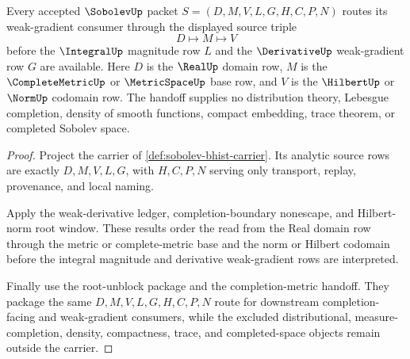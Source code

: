 \begin{theorem}
\label{thm:sobolev-source-triple-handoff}
Every accepted $\SobolevUp$ packet $S=(D,M,V,L,G,H,C,P,N)$ routes its weak-gradient consumer through the displayed source triple
$$
D \longmapsto M \longmapsto V
$$
before the $\IntegralUp$ magnitude row $L$ and the $\DerivativeUp$ weak-gradient row $G$ are available. Here $D$ is the $\RealUp$ domain row, $M$ is the $\CompleteMetricUp$ or $\MetricSpaceUp$ base row, and $V$ is the $\HilbertUp$ or $\NormUp$ codomain row. The handoff supplies no distribution theory, Lebesgue completion, density of smooth functions, compact embedding, trace theorem, or completed Sobolev space.
\end{theorem}
\begin{proof}
Project the carrier of \autoref{def:sobolev-bhist-carrier}. Its analytic source rows are exactly $D,M,V,L,G$, with $H,C,P,N$ serving only transport, replay, provenance, and local naming.

Apply the weak-derivative ledger, completion-boundary nonescape, and Hilbert-norm root window. These results order the read from the Real domain row through the metric or complete-metric base and the norm or Hilbert codomain before the integral magnitude and derivative weak-gradient rows are interpreted.

Finally use the root-unblock package and the completion-metric handoff. They package the same $D,M,V,L,G,H,C,P,N$ route for downstream completion-facing and weak-gradient consumers, while the excluded distributional, measure-completion, density, compactness, trace, and completed-space objects remain outside the carrier.
\end{proof}
